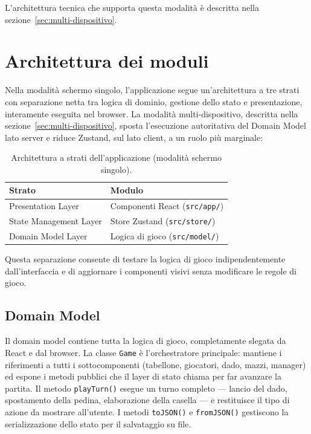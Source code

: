 \documentclass[12pt]{report}
\begin{document}
L'architettura tecnica che supporta questa modalità è descritta nella sezione~\ref{sec:multi-dispositivo}.

\section{Architettura dei moduli}

Nella modalità schermo singolo, l'applicazione segue un'architettura a tre strati con separazione netta tra logica di dominio, gestione dello stato e presentazione, interamente eseguita nel browser. La modalità multi-dispositivo, descritta nella sezione~\ref{sec:multi-dispositivo}, sposta l'esecuzione autoritativa del Domain Model lato server e riduce Zustand, sul lato client, a un ruolo più marginale:

\begin{table}[h]
    \centering
    \begin{tabular}{|l|l|}
    \hline
    \textbf{Strato} & \textbf{Modulo} \\ \hline
    Presentation Layer     & Componenti React (\texttt{src/app/}) \\ \hline
    State Management Layer & Store Zustand (\texttt{src/store/}) \\ \hline
    Domain Model Layer     & Logica di gioco (\texttt{src/model/}) \\ \hline
    \end{tabular}
    \caption{Architettura a strati dell'applicazione (modalità schermo singolo).}
    \label{tab:architettura}
\end{table}

Questa separazione consente di testare la logica di gioco indipendentemente dall'interfaccia e di aggiornare i componenti visivi senza modificare le regole di gioco.

\subsection{Domain Model}
\label{sec:domain-model}

Il domain model contiene tutta la logica di gioco, completamente slegata da React e dal browser.
La classe \texttt{Game} è l'orchestratore principale: mantiene i riferimenti a tutti i sottocomponenti (tabellone, giocatori, dado, mazzi, manager) ed espone i metodi pubblici che il layer di stato chiama per far avanzare la partita.
Il metodo \texttt{playTurn()} esegue un turno completo --- lancio del dado, spostamento della pedina, elaborazione della casella --- e restituisce il tipo di azione da mostrare all'utente.
I metodi \texttt{toJSON()} e \texttt{fromJSON()} gestiscono la serializzazione dello stato per il salvataggio su file.
\end{document}
